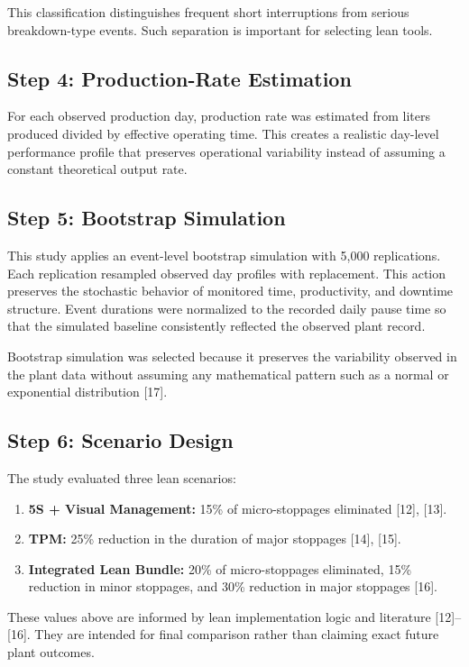 \documentclass[12pt,a4paper]{article}
\begin{document}
This classification distinguishes frequent short interruptions from serious breakdown-type events. Such separation is important for selecting lean tools.

\subsection{Step 4: Production-Rate Estimation}
For each observed production day, production rate was estimated from liters produced divided by effective operating time. This creates a realistic day-level performance profile that preserves operational variability instead of assuming a constant theoretical output rate.

\subsection{Step 5: Bootstrap Simulation}
This study applies an event-level bootstrap simulation with 5,000 replications. Each replication resampled observed day profiles with replacement. This action preserves the stochastic behavior of monitored time, productivity, and downtime structure. Event durations were normalized to the recorded daily pause time so that the simulated baseline consistently reflected the observed plant record.

Bootstrap simulation was selected because it preserves the variability observed in the plant data without assuming any mathematical pattern such as a normal or exponential distribution [17].

\subsection{Step 6: Scenario Design}
The study evaluated three lean scenarios:
\begin{enumerate}
    \item \textbf{5S + Visual Management:} 15\% of micro-stoppages eliminated [12], [13].
    \item \textbf{TPM:} 25\% reduction in the duration of major stoppages [14], [15].
    \item \textbf{Integrated Lean Bundle:} 20\% of micro-stoppages eliminated, 15\% reduction in minor stoppages, and 30\% reduction in major stoppages [16].
\end{enumerate}

These values above are informed by lean implementation logic and literature [12]--[16]. They are intended for final comparison rather than claiming exact future plant outcomes.
\end{document}
